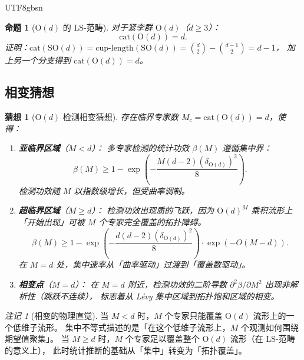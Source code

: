 \documentclass[12pt,a4paper]{article}
\theoremstyle{plain}
\newtheorem{proposition}[theorem]{命题}
\newtheorem{conjecture}[theorem]{猜想}
\theoremstyle{definition}
\theoremstyle{remark}
\newtheorem{remark}[theorem]{注记}
\newcommand{\Od}{\mathrm{O}(d)}
\begin{document}
\begin{CJK}{UTF8}{gbsn}
\begin{proposition}[$\Od$ 的 LS-范畴]\label{prop:cat_od}
对于紧李群 $\Od$（$d \geq 3$）：
\begin{equation}
    \mathrm{cat}(\Od) = d.
\end{equation}
证明：$\mathrm{cat}(\mathrm{SO}(d)) = \mathrm{cup\text{-}length}(\mathrm{SO}(d)) = \binom{d}{2} - \binom{d-1}{2} = d-1$，
加上另一个分支得到 $\mathrm{cat}(\Od) = d$。
\end{proposition}

\subsection{相变猜想}

\begin{conjecture}[$\Od$ 检测相变猜想]\label{conj:phase_transition}
存在临界专家数 $M_c = \mathrm{cat}(\Od) = d$，使得：

\begin{enumerate}[label=(\alph*)]
    \item \textbf{亚临界区域}（$M < d$）：
    多专家检测的统计功效 $\beta(M)$ 遵循集中界：
    \begin{equation}
        \beta(M) \geq 1 - \exp\!\left(-\frac{M(d-2)(\delta_{\Od})^2}{8}\right).
    \end{equation}
    检测功效随 $M$ 以指数级增长，但受曲率调制。

    \item \textbf{超临界区域}（$M \geq d$）：
    检测功效出现质的飞跃，因为 $\Od^M$ 乘积流形上「开始出现」可被 $M$ 个专家完全覆盖的拓扑障碍。
    \begin{equation}
        \beta(M) \geq 1 - \exp\!\left(-\frac{d(d-2)(\delta_{\Od})^2}{8}\right) \cdot \exp\!\left(-O(M-d)\right).
    \end{equation}
    在 $M = d$ 处，集中速率从「曲率驱动」过渡到「覆盖数驱动」。

    \item \textbf{相变点}（$M = d$）：
    在 $M = d$ 附近，检测功效的二阶导数 $\partial^2 \beta / \partial M^2$ 出现非解析性（跳跃不连续），
    标志着从 L\'{e}vy 集中区域到拓扑饱和区域的相变。
\end{enumerate}
\end{conjecture}

\begin{remark}[相变的物理直觉]
\label{rem:phase_intuition}
当 $M < d$ 时，$M$ 个专家只能覆盖 $\Od$ 流形上的一个低维子流形。
集中不等式描述的是「在这个低维子流形上，$M$ 个观测如何围绕期望值聚集」。
当 $M \geq d$ 时，$M$ 个专家足以覆盖整个 $\Od$ 流形（在 LS-范畴的意义上），
此时统计推断的基础从「集中」转变为「拓扑覆盖」。


\end{remark}
\end{CJK}
\end{document}

